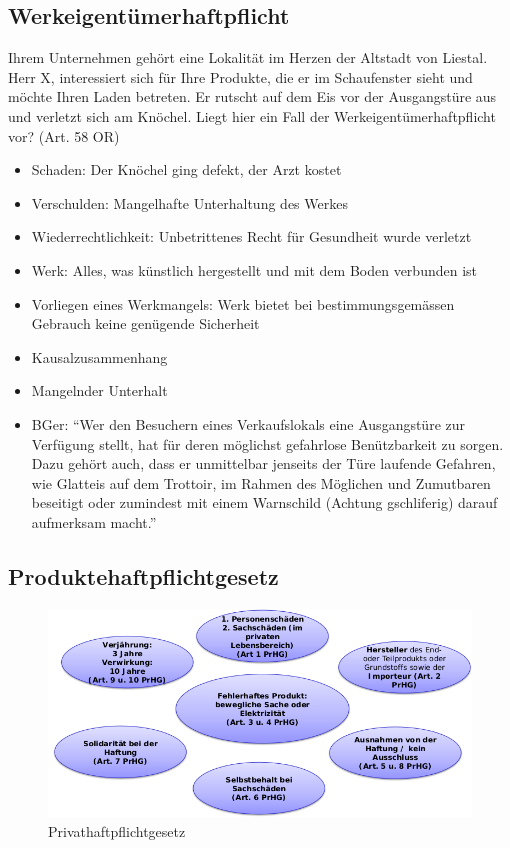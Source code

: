 \subsection{Werkeigentümerhaftpflicht}

Ihrem Unternehmen gehört eine Lokalität im Herzen der Altstadt von
Liestal. Herr X, interessiert sich für Ihre Produkte, die er im
Schaufenster sieht und möchte Ihren Laden betreten. Er rutscht auf dem
Eis vor der Ausgangstüre aus und verletzt sich am Knöchel. Liegt hier
ein Fall der Werkeigentümerhaftpflicht vor? (Art. 58 OR)

\begin{itemize}
	\tightlist
	\item Schaden: Der Knöchel ging defekt, der Arzt kostet
	\item Verschulden: Mangelhafte Unterhaltung des Werkes
	\item Wiederrechtlichkeit: Unbetrittenes Recht für Gesundheit wurde
	verletzt
	\item Werk: Alles, was künstlich hergestellt und mit dem Boden verbunden ist
	\item Vorliegen eines Werkmangels: Werk bietet bei bestimmungsgemässen
	Gebrauch keine genügende Sicherheit
	\item Kausalzusammenhang
	\item Mangelnder Unterhalt
	\item BGer: ``Wer den Besuchern eines Verkaufslokals eine Ausgangstüre zur
	Verfügung stellt, hat für deren möglichst gefahrlose Benützbarkeit zu
	sorgen. Dazu gehört auch, dass er unmittelbar jenseits der Türe
	laufende Gefahren, wie Glatteis auf dem Trottoir, im Rahmen des
	Möglichen und Zumutbaren beseitigt oder zumindest mit einem Warnschild
	(Achtung gschliferig) darauf aufmerksam macht.''
\end{itemize}

\subsection{Produktehaftpflichtgesetz}

\begin{figure}[H]
	\centering
	\includegraphics[width=.8\textwidth]{figures/produkthaftpflicht.png}
	\caption{Privathaftpflichtgesetz}
\end{figure}

